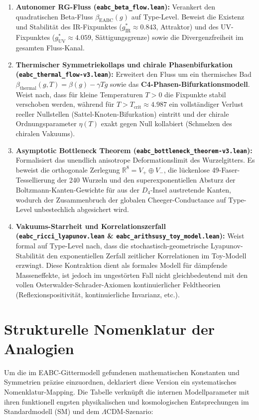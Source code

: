 \documentclass[11pt,a4paper]{article}
\begin{document}
\begin{enumerate}
		\item \textbf{Autonomer RG-Fluss (\texttt{eabc\_beta\_flow.lean}):} Verankert den quadratischen Beta-Fluss $\beta_{\text{EABC}}(g)$ auf Type-Level. Beweist die Existenz und Stabilität des IR-Fixpunktes ($g^*_{\text{IR}} \approx 0.843$, Attraktor) und des UV-Fixpunktes ($g^*_{\text{UV}} \approx 4.059$, Sättigungsgrenze) sowie die Divergenzfreiheit im gesamten Fluss-Kanal.
		\item \textbf{Thermischer Symmetriekollaps und chirale Phasenbifurkation (\texttt{eabc\_thermal\_flow-v3.lean}):} Erweitert den Fluss um ein thermisches Bad $\beta_{\text{thermal}}(g, T) = \beta(g) - \gamma T g$ sowie das \textbf{C4-Phasen-Bifurkationsmodell}. Weist nach, dass für kleine Temperaturen $T > 0$ die Fixpunkte stabil verschoben werden, während für $T > T_{\text{crit}} \approx 4.987$ ein vollständiger Verlust reeller Nullstellen (Sattel-Knoten-Bifurkation) eintritt und der chirale Ordnungsparameter $\eta(T)$ exakt gegen Null kollabiert (Schmelzen des chiralen Vakuums).
		\item \textbf{Asymptotic Bottleneck Theorem (\texttt{eabc\_bottleneck\_theorem-v3.lean}):} Formalisiert das unendlich anisotrope Deformationslimit des Wurzelgitters. Es beweist die orthogonale Zerlegung $\mathbb{R}^8 = V_+ \oplus V_-$, die lückenlose 49-Faser-Tessellierung der 240 Wurzeln und den superexponentiellen Absturz der Boltzmann-Kanten-Gewichte für aus der $D_4$-Insel austretende Kanten, wodurch der Zusammenbruch der globalen Cheeger-Conductance auf Type-Level unbestechlich abgesichert wird.
		\item \textbf{Vakuums-Starrheit und Korrelationszerfall (\texttt{eabc\_ricci\_lyapunov.lean} \& \texttt{eabc\_arithsusy\_toy\_model.lean}):} Weist formal auf Type-Level nach, dass die stochastisch-geometrische Lyapunov-Stabilität den exponentiellen Zerfall zeitlicher Korrelationen im Toy-Modell erzwingt. Diese Kontraktion dient als formales Modell für dämpfende Masseneffekte, ist jedoch im ungestörten Fall nicht gleichbedeutend mit den vollen Osterwalder-Schrader-Axiomen kontinuierlicher Feldtheorien (Reflexionspositivität, kontinuierliche Invarianz, etc.).
	\end{enumerate}
	
	\section{Strukturelle Nomenklatur der Analogien}
	Um die im EABC-Gittermodell gefundenen mathematischen Konstanten und Symmetrien präzise einzuordnen, deklariert diese Version ein systematisches Nomenklatur-Mapping. Die Tabelle verknüpft die internen Modellparameter mit ihren funktionell engsten physikalischen und kosmologischen Entsprechungen im Standardmodell (SM) und dem $\Lambda$CDM-Szenario:
	
\end{document}
